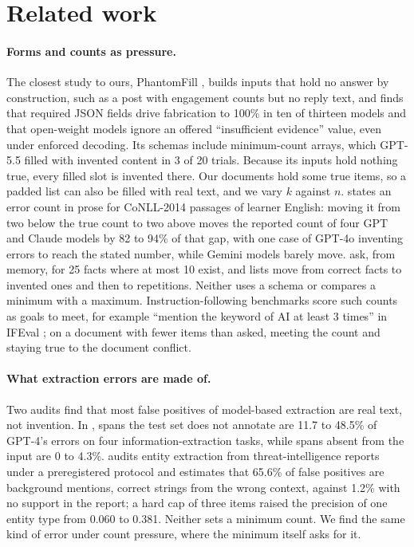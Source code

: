 \section{Related work}
\label{sec:related}

\paragraph{Forms and counts as pressure.}
The closest study to ours, PhantomFill \citep{usman2026phantomfill}, builds inputs that hold no answer by construction, such as a post with engagement counts but no reply text, and finds that required JSON fields drive fabrication to 100\% in ten of thirteen models and that open-weight models ignore an offered ``insufficient evidence'' value, even under enforced decoding.
Its schemas include minimum-count arrays, which GPT-5.5 filled with invented content in 3 of 20 trials.
Because its inputs hold nothing true, every filled slot is invented there.
Our documents hold some true items, so a padded list can also be filled with real text, and we vary $k$ against $n$.
\citet{yang2026prompt} states an error count in prose for CoNLL-2014 passages of learner English: moving it from two below the true count to two above moves the reported count of four GPT and Claude models by 82 to 94\% of that gap, with one case of GPT-4o inventing errors to reach the stated number, while Gemini models barely move.
\citet{ivgi2025loops} ask, from memory, for 25 facts where at most 10 exist, and lists move from correct facts to invented ones and then to repetitions.
Neither uses a schema or compares a minimum with a maximum.
Instruction-following benchmarks score such counts as goals to meet, for example ``mention the keyword of AI at least 3 times'' in IFEval \citep{zhou2023instruction}; on a document with fewer items than asked, meeting the count and staying true to the document conflict.

\paragraph{What extraction errors are made of.}
Two audits find that most false positives of model-based extraction are real text, not invention.
In \citet{han2023empirical}, spans the test set does not annotate are 11.7 to 48.5\% of GPT-4's errors on four information-extraction tasks, while spans absent from the input are 0 to 4.3\%.
\citet{qian2026unreliable} audits entity extraction from threat-intelligence reports under a preregistered protocol and estimates that 65.6\% of false positives are background mentions, correct strings from the wrong context, against 1.2\% with no support in the report; a hard cap of three items raised the precision of one entity type from 0.060 to 0.381.
Neither sets a minimum count.
We find the same kind of error under count pressure, where the minimum itself asks for it.

